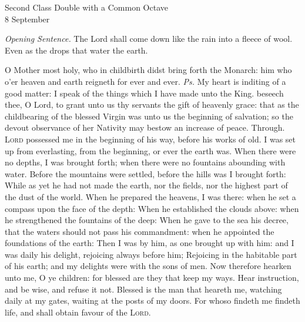 \begin{inhead}
    {Second Class Double with a Common Octave\\
8 September}
\end{inhead}
\par\noindent
\textit{Opening Sentence.} The Lord shall come down like the rain into a fleece of wool. Even as the drops that water the earth.%

\introit
{} O Mother most holy, who in childbirth didst bring forth the Monarch: him who o'er heaven and earth reigneth for ever and ever. \textit{Ps.} My heart is inditing of a good matter: I speak of the things which I have made unto the King.
\collect
{} beseech thee, O Lord, to grant unto us thy servants the gift of heavenly grace: that as the childbearing of the blessed Virgin was unto us the beginning of salvation; so the devout observance of her Nativity may bestow an increase of peace. Through.
 \textsc{Lord} possessed me in the beginning of his way, before his works of old. I was set up from everlasting, from the beginning, or ever the earth was. When there were no depths, I was brought forth; when there were no fountains abounding with water. Before the mountains were settled, before the hills was I brought forth: While as yet he had not made the earth, nor the fields, nor the highest part of the dust of the world. When he prepared the heavens, I was there: when he set a compass upon the face of the depth: When he established the clouds above: when he strengthened the fountains of the deep: When he gave to the sea his decree, that the waters should not pass his commandment: when he appointed the foundations of the earth: Then I was by him, as one brought up with him: and I was daily his delight, rejoicing always before him; Rejoicing in the habitable part of his earth; and my delights were with the sons of men. Now therefore hearken unto me, O ye children: for blessed are they that keep my ways. Hear instruction, and be wise, and refuse it not. Blessed is the man that heareth me, watching daily at my gates, waiting at the posts of my doors. For whoso findeth me findeth life, and shall obtain favour of the \textsc{Lord}.
